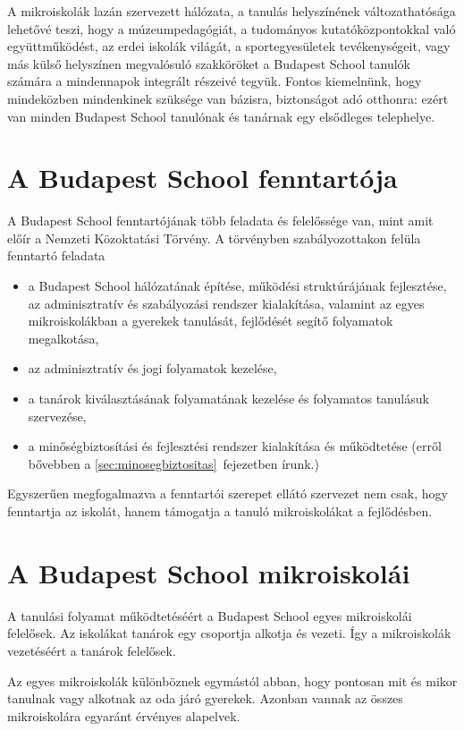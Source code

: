 A mikroiskolák lazán szervezett hálózata, a tanulás helyszínének változathatósága lehetővé teszi, hogy a múzeumpedagógiát, a tudományos kutatóközpontokkal való együttműködést, az erdei iskolák világát, a sportegyesületek tevékenységeit, vagy más külső helyszínen megvalósuló szakköröket a Budapest School tanulók számára a mindennapok integrált részeivé tegyük. Fontos kiemelnünk, hogy mindeközben mindenkinek szüksége van bázisra, biztonságot adó otthonra: ezért van minden Budapest School tanulónak és tanárnak egy elsődleges telephelye.




  \section{A Budapest School fenntartója}
  A Budapest School fenntartójának több feladata és felelőssége van, mint amit előír a Nemzeti Közoktatási Törvény. A törvényben szabályozottakon felüla fenntartó feladata
  \begin{itemize}
  \item a Budapest School hálózatának építése, működési struktúrájának
  fejlesztése, az adminisztratív és szabályozási rendszer kialakítása,
  valamint az egyes mikroiskolákban a gyerekek tanulását, fejlődését segítő folyamatok megalkotása,
  \item  az adminisztratív és jogi folyamatok kezelése,
  \item  a tanárok kiválasztásának folyamatának kezelése és folyamatos tanulásuk szervezése,
  \item a minőségbiztosítási és fejlesztési rendszer kialakítása és működtetése (erről bővebben a \ref{sec:minosegbiztositas}~fejezetben írunk.)
\end{itemize}

 Egyszerűen megfogalmazva a fenntartói szerepet ellátó szervezet nem csak, hogy fenntartja az iskolát, hanem támogatja a tanuló mikroiskolákat a fejlődésben.

  \section{A Budapest School mikroiskolái}

  A tanulási folyamat működtetéséért a Budapest School egyes mikroiskolái
  felelősek. Az iskolákat tanárok egy csoportja alkotja és vezeti. Így a 
  mikroiskolák vezetéséért a tanárok felelősek.

  Az egyes mikroiskolák különböznek egymástól abban, hogy pontosan mit és mikor
  tanulnak vagy alkotnak az oda járó gyerekek. Azonban vannak az összes mikroiskolára
  egyaránt érvényes alapelvek.

